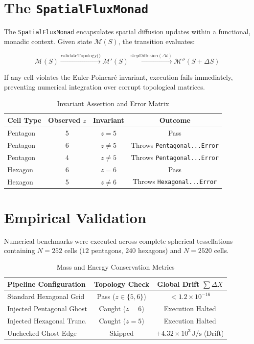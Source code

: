 \documentclass[10pt,twocolumn,a4paper]{article}
\begin{document}
\section{The \texttt{SpatialFluxMonad}}

The \texttt{SpatialFluxMonad} encapsulates spatial diffusion updates within a functional, monadic context. Given state $\mathcal{M}(S)$, the transition evaluates:

\begin{equation}
\mathcal{M}(S) \xrightarrow{\text{validateTopology()}} \mathcal{M}'(S) \xrightarrow{\text{stepDiffusion}(\Delta t)} \mathcal{M}''(S + \Delta S)
\end{equation}

If any cell violates the Euler-Poincar\'{e} invariant, execution fails immediately, preventing numerical integration over corrupt topological matrices.

\begin{table}[h]
\centering
\caption{Invariant Assertion and Error Matrix}
\label{tab:invariants}
\begin{tabular}{lccc}
\toprule
\textbf{Cell Type} & \textbf{Observed $z$} & \textbf{Invariant} & \textbf{Outcome} \\
\midrule
Pentagon & 5 & $z = 5$ & Pass \\
Pentagon & 6 & $z \ne 5$ & Throws \texttt{Pentagonal...Error} \\
Pentagon & 4 & $z \ne 5$ & Throws \texttt{Pentagonal...Error} \\
Hexagon  & 6 & $z = 6$ & Pass \\
Hexagon  & 5 & $z \ne 6$ & Throws \texttt{Hexagonal...Error} \\
\bottomrule
\end{tabular}
\end{table}

\section{Empirical Validation}

Numerical benchmarks were executed across complete spherical tessellations containing $N = 252$ cells ($12$ pentagons, $240$ hexagons) and $N = 2520$ cells. 

\begin{table}[h]
\centering
\caption{Mass and Energy Conservation Metrics}
\label{tab:results}
\begin{tabular}{lcc}
\toprule
\textbf{Pipeline Configuration} & \textbf{Topology Check} & \textbf{Global Drift $\sum \Delta X$} \\
\midrule
Standard Hexagonal Grid & Pass ($z \in \{5,6\}$) & $< 1.2 \times 10^{-16}$ \\
Injected Pentagonal Ghost & Caught ($z=6$) & Execution Halted \\
Injected Hexagonal Trunc. & Caught ($z=5$) & Execution Halted \\
Unchecked Ghost Edge & Skipped & $+4.32 \times 10^{3}\,\text{J/s}$ (Drift) \\
\bottomrule
\end{tabular}
\end{table}
\end{document}
